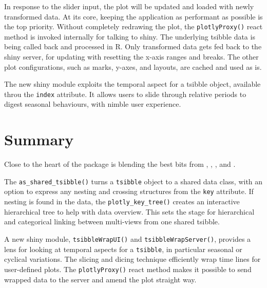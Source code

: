 In response to the slider input, the plot will be updated and loaded
with newly transformed data. At its core, keeping the application as
performant as possible is the top priority. Without completely redrawing
the plot, the \texttt{plotlyProxy()} react method is invoked internally
for talking to shiny. The underlying tsibble data is being called back
and processed in R. Only transformed data gets fed back to the shiny
server, for updating with resetting the x-axis ranges and breaks. The
other plot configurations, such as marks, y-axes, and layouts, are
cached and used as is.

The new shiny module exploits the temporal aspect for a tsibble object,
available throu the \texttt{index} attribute. It allows users to slide
through relative periods to digest seasonal behaviours, with nimble user
experience.

\hypertarget{summary}{%
\section{Summary}\label{summary}}

Close to the heart of the  package is blending the
best bits from , , ,
and .

The \texttt{as\_shared\_tsibble()} turns a \texttt{tsibble} object to a
shared data class, with an option to express any nesting and crossing
structures from the \texttt{key} attribute. If nesting is found in the
data, the \texttt{plotly\_key\_tree()} creates an interactive
hierarchical tree to help with data overview. This sets the stage for
hierarchical and categorical linking between multi-views from one shared
tsibble.

A new shiny module, \texttt{tsibbleWrapUI()} and
\texttt{tsibbleWrapServer()}, provides a lens for looking at temporal
aspects for a \texttt{tsibble}, in particular seasonal or cyclical
variations. The slicing and dicing technique efficiently wrap time lines
for user-defined plots. The \texttt{plotlyProxy()} react method makes it
possible to send wrapped data to the server and amend the plot straight
way.



\address{%
Earo Wang\\
The University of Auckland\\%
Department of Statistics\\
%
%
%
\\\href{mailto:earo.wang@auckland.ac.nz}{\nolinkurl{earo.wang@auckland.ac.nz}}
}

\address{%
Dianne Cook\\
Monash University\\%
Department of Econometrics and Business Statistics\\
%
%
%
\\\href{mailto:dicook@monash.edu}{\nolinkurl{dicook@monash.edu}}
}

